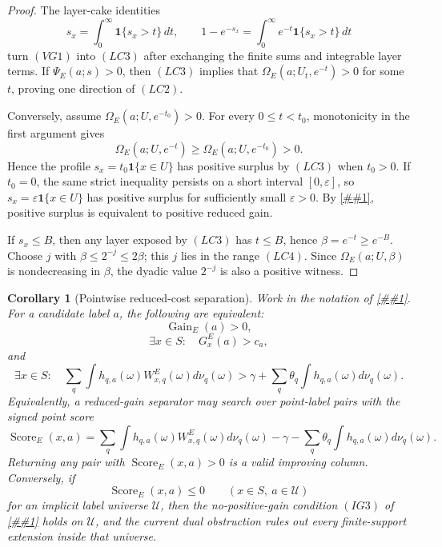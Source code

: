 \documentclass[10pt]{article}
\newcommand{\cref}[1]{\ref{##1}}
\newtheorem{corollary}[theorem]{Corollary}
\theoremstyle{definition}
\begin{document}
\begin{proof}
   The layer-cake identities
   \[
      s_x=\int_0^\infty \mathbf 1\{s_x>t\}\,dt,
      \qquad
      1-e^{-s_x}=\int_0^\infty e^{-t}\mathbf 1\{s_x>t\}\,dt
   \]
   turn \((VG1)\) into \((LC3)\) after exchanging the finite sums and
   integrable layer terms.  If \(\Psi_E(a;s)>0\), then \((LC3)\) implies that
   \(\Omega_E(a;U_t,e^{-t})>0\) for some \(t\), proving one direction of
   \((LC2)\).

   Conversely, assume \(\Omega_E(a;U,e^{-t_0})>0\).  For every \(0\le t<t_0\),
   monotonicity in the first argument gives
   \[
      \Omega_E(a;U,e^{-t})
      \ge
      \Omega_E(a;U,e^{-t_0})>0 .
   \]
   Hence the profile \(s_x=t_0\mathbf 1\{x\in U\}\) has positive surplus by
   \((LC3)\) when \(t_0>0\).  If \(t_0=0\), the same strict inequality persists
   on a short interval \([0,\varepsilon]\), so
   \(s_x=\varepsilon\mathbf 1\{x\in U\}\) has positive surplus for sufficiently
   small \(\varepsilon>0\).  By
   \cref{lem:reduced-gain-variational-separation}, positive surplus is
   equivalent to positive reduced gain.

   If \(s_x\le B\), then any layer exposed by \((LC3)\) has
   \(t\le B\), hence \(\beta=e^{-t}\ge e^{-B}\).  Choose \(j\) with
   \(\beta\le 2^{-j}\le 2\beta\); this \(j\) lies in the range \((LC4)\).
   Since \(\Omega_E(a;U,\beta)\) is nondecreasing in \(\beta\), the dyadic
   value \(2^{-j}\) is also a positive witness.
\end{proof}

\begin{corollary}[Pointwise reduced-cost separation]
   \label{cor:pointwise-reduced-cost-separation}
   Work in the notation of
   \cref{lem:reduced-gain-variational-separation}.  For a candidate label
   \(a\), the following are equivalent:
   \[
      \operatorname{Gain}_E(a)>0,
      \tag{PW1}
   \]
   \[
      \exists x\in S:\quad G_x^E(a)>c_a,
      \tag{PW2}
   \]
   and
   \[
      \exists x\in S:\quad
      \sum_q\int h_{q,a}(\omega)W^E_{x,q}(\omega)d\nu_q(\omega)
      >
      \gamma+\sum_q\theta_q\int h_{q,a}(\omega)d\nu_q(\omega).
      \tag{PW3}
   \]
   Equivalently, a reduced-gain separator may search over point-label pairs
   with the signed point score
   \[
      \operatorname{Score}_E(x,a)
      =
      \sum_q\int h_{q,a}(\omega)W^E_{x,q}(\omega)d\nu_q(\omega)
      -
      \gamma-\sum_q\theta_q\int h_{q,a}(\omega)d\nu_q(\omega).
      \tag{PW4}
   \]
   Returning any pair with \(\operatorname{Score}_E(x,a)>0\) is a valid
   improving column.  Conversely, if
   \[
      \operatorname{Score}_E(x,a)\le0
      \qquad(x\in S,\ a\in\mathcal U)
      \tag{PW5}
   \]
   for an implicit label universe \(\mathcal U\), then the no-positive-gain
   condition \((IG3)\) of \cref{lem:implicit-reduced-gain-separation} holds on
   \(\mathcal U\), and the current dual obstruction rules out every
   finite-support extension inside that universe.
\end{corollary}
\end{document}
